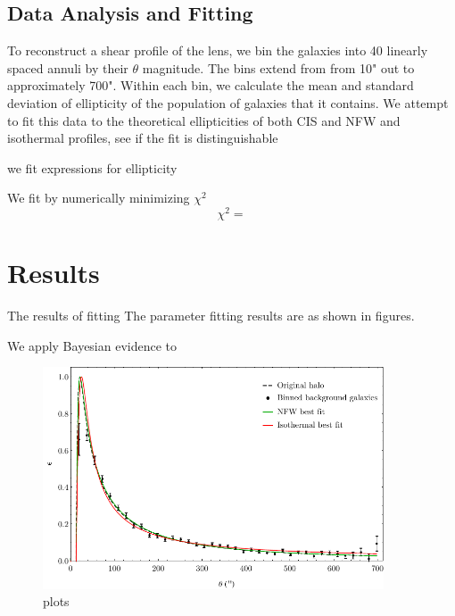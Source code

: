 \documentclass[10pt]{article}
\begin{document}
\subsection{Data Analysis and Fitting}
To reconstruct a shear profile of the lens, we bin the galaxies into 40 linearly spaced annuli by their $\theta$ magnitude. The bins extend from from 10" out to approximately 700". Within each bin, we calculate the mean and standard deviation of ellipticity of the population of galaxies that it contains. We attempt to fit this data to the theoretical ellipticities of  both CIS and NFW and isothermal profiles, see if the fit is distinguishable


we fit expressions for ellipticity

We fit by numerically minimizing $\chi^2$
\begin{equation}
\chi^2 =
\end{equation}



\section{Results}
The results of fitting
The parameter fitting results are as shown in figures.

We apply Bayesian evidence to

\begin{figure}
    \centering
    \includegraphics[width=0.9\textwidth]{comparison.pdf}
    \caption{plots}
    \label{}
\end{figure}

\end{document}
